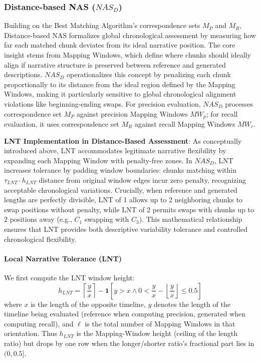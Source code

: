 \documentclass[main.tex]{subfiles}
\begin{document}
\subsubsection{Distance-based NAS ($NAS_D$)}
Building on the Best Matching Algorithm's correspondence sets $M_P$ and $M_R$, Distance-based NAS formalizes global chronological assessment by measuring how far each matched chunk deviates from its ideal narrative position. The core insight stems from Mapping Windows, which define where chunks should ideally align if narrative structure is preserved between reference and generated descriptions. $NAS_D$ operationalizes this concept by penalizing each chunk proportionally to its distance from the ideal region defined by the Mapping Windows, making it particularly sensitive to global chronological alignment violations like beginning-ending swaps. For precision evaluation, $NAS_D$ processes correspondence set $M_P$ against precision Mapping Windows $MW_p$; for recall evaluation, it uses correspondence set $M_R$ against recall Mapping Windows $MW_r$.

\textbf{LNT Implementation in Distance-Based Assessment}: As conceptually introduced above, LNT accommodates legitimate narrative flexibility by expanding each Mapping Window with penalty-free zones. In $NAS_D$, LNT increases tolerance by padding window boundaries: chunks matching within $\tau_{LNT} \cdot h_{LNT}$ distance from original window edges incur zero penalty, recognizing acceptable chronological variations. Crucially, when reference and generated lengths are perfectly divisible, LNT of 1 allows up to 2 neighboring chunks to swap positions without penalty, while LNT of 2 permits swaps with chunks up to 2 positions away (e.g., $C_1$ swapping with $C_3$). This mathematical relationship ensures that LNT provides both descriptive variability tolerance and controlled chronological flexibility.

\paragraph{Local Narrative Tolerance (LNT)}
We first compute the LNT window height:
\begin{equation}
h_{LNT} = \left\lceil \frac{y}{x} \right\rceil - \mathbf{1}[y > x \land 0 < \frac{y}{x} - \left\lfloor \frac{y}{x} \right\rfloor \leq 0.5]
\end{equation}
where $x$ is the length of the opposite timeline, $y$ denotes the length of the timeline being evaluated (reference when computing precision, generated when computing recall), and $\ell$ is the total number of Mapping Windows in that orientation. Thus $h_{LNT}$ is the Mapping-Window height (ceiling of the length ratio) but drops by one row when the longer/shorter ratio's fractional part lies in $(0, 0.5]$.
\end{document}
